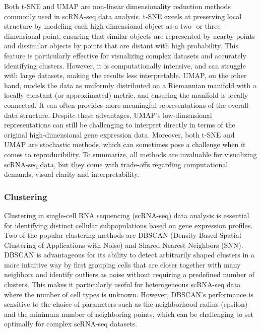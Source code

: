 \documentclass[11pt]{article}
\begin{document}
\begin{multicols}{2}
    Both t-SNE and UMAP are non-linear dimensionality reduction methods commonly used in scRNA-seq data analysis. t-SNE excels at preserving local structure by modeling each high-dimensional object as a two- or three-dimensional point, ensuring that similar objects are represented by nearby points and dissimilar objects by points that are distant with high probability. This feature is particularly effective for visualizing complex datasets and accurately identifying clusters\cite{maaten_visualizing_2008}. However, it is computationally intensive, and can struggle with large datasets, making the results less interpretable. UMAP, on the other hand, models the data as uniformly distributed on a Riemannian manifold with a locally constant (or approximated) metric, and ensuring the manifold is locally connected. It can often provides more meaningful representations of the overall data structure\cite{mcinnes_umap_2018}. Despite these advantages, UMAP’s low-dimensional representations can still be challenging to interpret directly in terms of the original high-dimensional gene expression data. Moreover, both t-SNE and UMAP are stochastic methods, which can sometimes pose a challenge when it comes to reproducibility. To summarize, all methods are invaluable for visualizing scRNA-seq data, but they come with trade-offs regarding computational demands, visual clarity and interpretability.

    \subsubsection{Clustering}

    Clustering in single-cell RNA sequencing (scRNA-seq) data analysis is essential for identifying distinct cellular subpopulations based on gene expression profiles. Two of the popular clustering methods are DBSCAN (Density-Based Spatial Clustering of Applications with Noise) and Shared Nearest Neighbors (SNN). DBSCAN is advantageous for its ability to detect arbitrarily shaped clusters in a more intuitive way by first grouping cells that are closer together with many neighbors and identify outliers as noise without requiring a predefined number of clusters\cite{ester_density-based_1996}. This makes it particularly useful for heterogeneous scRNA-seq data where the number of cell types is unknown. However, DBSCAN's performance is sensitive to the choice of parameters such as the neighborhood radius (epsilon) and the minimum number of neighboring points, which can be challenging to set optimally for complex scRNA-seq datasets.


\end{multicols}
\end{document}
